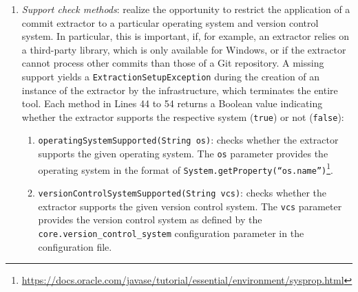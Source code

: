 \begin{enumerate}
\begin{enumerate}
	\end{enumerate}
	\item \textit{Support check methods}: realize the opportunity to restrict the application of a commit extractor to a particular operating system and version control system. In particular, this is important, if, for example, an extractor relies on a third-party library, which is only available for Windows, or if the extractor cannot process other commits than those of a Git repository. A missing support yields a \texttt{ExtractionSetupException} during the creation of an instance of the extractor by the infrastructure, which terminates the entire tool. Each method in Lines 44 to 54 returns a Boolean value indicating whether the extractor supports the respective system (\texttt{true}) or not (\texttt{false}):
	\begin{enumerate}
		\item \texttt{operatingSystemSupported(String os)}: checks whether the extractor supports the given operating system. The \texttt{os} parameter provides the operating system in the format of \texttt{System.getProperty(``os.name'')}\footnote{\url{https://docs.oracle.com/javase/tutorial/essential/environment/sysprop.html}}.
		\item \texttt{versionControlSystemSupported(String vcs)}: checks whether the extractor supports the given version control system. The \texttt{vcs} parameter provides the version control system as defined by the \texttt{core.version\_control\_system} configuration parameter in the configuration file.
	\end{enumerate}
\end{enumerate}

